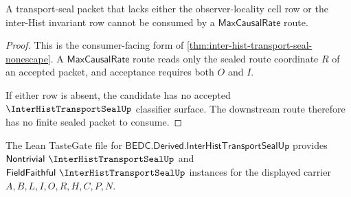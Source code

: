 \begin{theorem}
\label{thm:inter-hist-transport-seal-falsifiable-prediction}
A transport-seal packet that lacks either the observer-locality cell row or the inter-Hist invariant row cannot be consumed by a $\mathsf{MaxCausalRate}$ route.
\end{theorem}
\begin{proof}
This is the consumer-facing form of \autoref{thm:inter-hist-transport-seal-nonescape}. A $\mathsf{MaxCausalRate}$ route reads only the sealed route coordinate $R$ of an accepted packet, and acceptance requires both $O$ and $I$.

If either row is absent, the candidate has no accepted $\InterHistTransportSealUp$ classifier surface. The downstream route therefore has no finite sealed packet to consume.
\end{proof}



The Lean TasteGate file for $\mathsf{BEDC.Derived.InterHistTransportSealUp}$ provides $\mathsf{Nontrivial}\ \InterHistTransportSealUp$ and $\mathsf{FieldFaithful}\ \InterHistTransportSealUp$ instances for the displayed carrier $A,B,L,I,O,R,H,C,P,N$.

